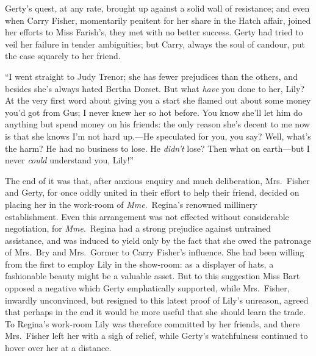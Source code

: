 \documentclass[12pt,a4paper]{book}
\begin{document}
Gerty's quest, at any rate, brought up against a solid wall of
resistance; and even when Carry Fisher, momentarily penitent for
her share in the Hatch affair, joined her efforts to Miss Farish's,
they met with no better success. Gerty had tried to veil her
failure in tender ambiguities; but Carry, always the soul of
candour, put the case squarely to her friend.





``I went straight to Judy Trenor; she has fewer prejudices than
the others, and besides she's always hated Bertha Dorset. But
what \textit{have} you done to her, Lily? At the very first word about
giving you a start she flamed out about some money you'd got from
Gus; I never knew her so hot before. You know she'll let him do
anything but spend money on his friends: the only reason she's
decent to me now is that she knows I'm not hard up.---He
speculated for you, you say? Well, what's the harm? He had no
business to lose. He \textit{didn't} lose? Then what on earth---but I never
\textit{could} understand you, Lily!''





The end of it was that, after anxious enquiry and much
deliberation, Mrs.\ Fisher and Gerty, for once oddly united in
their effort to help their friend, decided on placing her in the
work-room of \textit{Mme}.\ Regina's renowned millinery establishment. Even
this arrangement was not effected without considerable
negotiation, for \textit{Mme}.\ Regina had a strong prejudice against
untrained assistance, and was induced to yield only by the fact
that she owed the patronage of Mrs.\ Bry and Mrs.\ Gormer to Carry
Fisher's influence. She had been willing from the first to employ
Lily in the show-room: as a displayer of hats, a fashionable
beauty might be a valuable asset. But to this suggestion Miss
Bart opposed a negative which Gerty emphatically supported, while
Mrs.\ Fisher, inwardly unconvinced, but resigned to this latest
proof of Lily's unreason, agreed that perhaps in the end it would
be more useful that she should learn the trade. To Regina's
work-room Lily was therefore committed by her friends, and there
Mrs.\ Fisher left her with a sigh of relief, while Gerty's
watchfulness continued to hover over her at a distance.
\end{document}
